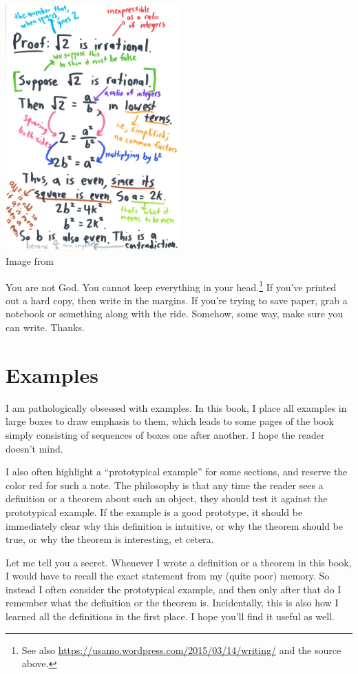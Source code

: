 \begin{center}
	\includegraphics[width=0.5\textwidth]{media/read-with-pencil.jpg}
	\\ \scriptsize Image from \cite{img:read_with_pencil}
\end{center}
You are not God.
You cannot keep everything in your head.\footnote{
	See also \url{https://usamo.wordpress.com/2015/03/14/writing/}
	and the source above.}
If you've printed out a hard copy, then write in the margins.
If you're trying to save paper,
grab a notebook or something along with the ride.
Somehow, some way, make sure you can write. Thanks.

\section{Examples}
I am pathologically obsessed with examples.
In this book, I place all examples in large boxes to draw emphasis to them,
which leads to some pages of the book simply consisting of sequences of boxes
one after another. I hope the reader doesn't mind.

I also often highlight a ``prototypical example'' for some sections,
and reserve the color red for such a note.
The philosophy is that any time the reader sees a definition
or a theorem about such an object, they should test it
against the prototypical example.
If the example is a good prototype, it should be immediately clear
why this definition is intuitive, or why the theorem should be true,
or why the theorem is interesting, et cetera.

Let me tell you a secret.  Whenever I wrote a definition or a theorem in this book,
I would have to recall the exact statement from my (quite poor) memory.
So instead I often consider the prototypical example,
and then only after that do I remember what the definition or the theorem is.
Incidentally, this is also how I learned all the definitions in the first place.
I hope you'll find it useful as well.

